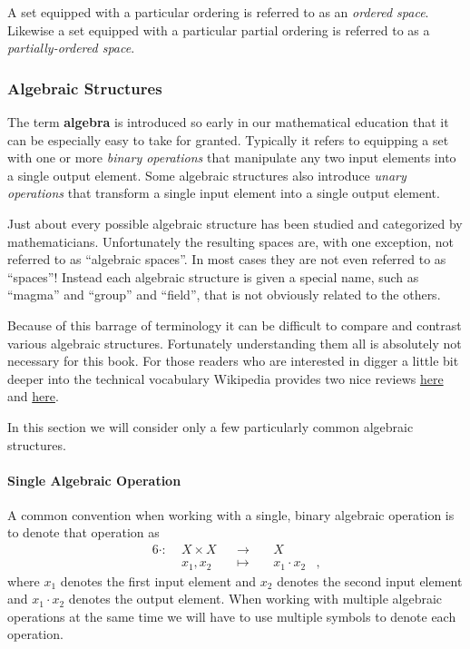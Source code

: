 \documentclass[
  letterpaper,
  DIV=11,
  numbers=noendperiod]{scrartcl}
\let\oldparagraph\paragraph
\renewcommand{\paragraph}[1]{\oldparagraph{#1}\mbox{}}
\begin{document}
A set equipped with a particular ordering is referred to as an
\emph{ordered space}. Likewise a set equipped with a particular partial
ordering is referred to as a \emph{partially-ordered space}.

\hypertarget{algebraic-structures}{%
\subsubsection{Algebraic Structures}\label{algebraic-structures}}

The term \textbf{algebra} is introduced so early in our mathematical
education that it can be especially easy to take for granted. Typically
it refers to equipping a set with one or more \emph{binary operations}
that manipulate any two input elements into a single output element.
Some algebraic structures also introduce \emph{unary operations} that
transform a single input element into a single output element.

Just about every possible algebraic structure has been studied and
categorized by mathematicians. Unfortunately the resulting spaces are,
with one exception, not referred to as ``algebraic spaces''. In most
cases they are not even referred to as ``spaces''! Instead each
algebraic structure is given a special name, such as ``magma'' and
``group'' and ``field'', that is not obviously related to the others.

Because of this barrage of terminology it can be difficult to compare
and contrast various algebraic structures. Fortunately understanding
them all is absolutely not necessary for this book. For those readers
who are interested in digger a little bit deeper into the technical
vocabulary Wikipedia provides two nice reviews
\href{https://en.wikipedia.org/wiki/Algebraic_structure\#Common_algebraic_structures}{here}
and
\href{https://en.wikipedia.org/wiki/Outline_of_algebraic_structures\#Types_of_algebraic_structures}{here}.

In this section we will consider only a few particularly common
algebraic structures.

\hypertarget{single-algebraic-operation}{%
\paragraph{Single Algebraic
Operation}\label{single-algebraic-operation}}

A common convention when working with a single, binary algebraic
operation is to denote that operation as \begin{alignat*}{6}
\cdot :\; & X \times X& &\rightarrow& \; & X &
\\
& x_{1}, x_{2} & &\mapsto& & x_{1} \cdot x_{2} &,
\end{alignat*} where \(x_{1}\) denotes the first input element and
\(x_{2}\) denotes the second input element and \(x_{1} \cdot x_{2}\)
denotes the output element. When working with multiple algebraic
operations at the same time we will have to use multiple symbols to
denote each operation.
\end{document}
